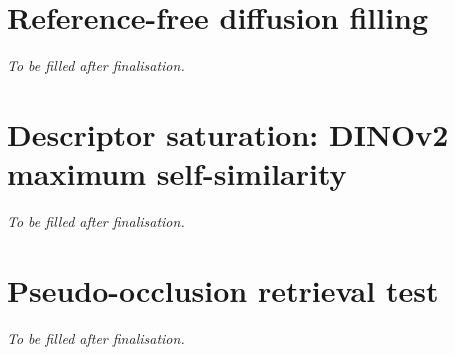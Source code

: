 \documentclass[10pt]{article}
\begin{document}
\section{Reference-free diffusion filling}
\label{supp:sd}
\emph{To be filled after finalisation.}

\section{Descriptor saturation: DINOv2 maximum self-similarity}
\label{supp:dino}
\emph{To be filled after finalisation.}

\section{Pseudo-occlusion retrieval test}
\label{supp:retrieval}
\emph{To be filled after finalisation.}
\end{document}
